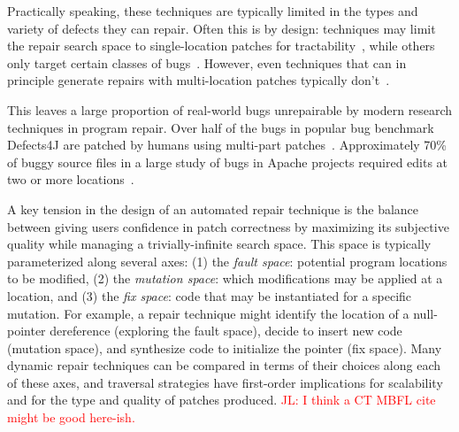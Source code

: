 \documentclass[sigconf, timestamp-false, anonymous=true]{acmart}
\newcommand\todo[1]{\textcolor{red}{#1}}
\begin{document}
Practically speaking, these techniques are typically limited in the types and
variety of defects they can repair. Often this is by design: techniques may
limit the repair search space to single-location patches for
tractability~\cite{rsrepair,ae,hdrepair}, while others only target certain
classes of bugs~\cite{Xuan17,sapfix,DeMarco14,par}. However, even techniques
that can in principle generate repairs with multi-location patches typically
don't~\cite{genprog,others}.

This leaves a large proportion of real-world bugs unrepairable by modern
research techniques in program repair.  Over half of the bugs in popular bug
benchmark Defects4J are patched by humans using multi-part
patches~\cite{d4j-dissection}. Approximately 70\% of buggy source files in a
large study of bugs in Apache projects required edits at two or more
locations~\cite{zhong2015}.

A key tension in the design of an automated repair technique is the balance
between giving users confidence in patch correctness by maximizing its
subjective quality while managing a trivially-infinite search space. This space
is typically parameterized along several axes: (1) the \emph{fault space}:
potential program locations to be modified, (2) the \emph{mutation space}: which
modifications may be applied at a location, and (3) the \emph{fix space}: code
that may be instantiated for a specific mutation. For example, a repair
technique might identify the location of a null-pointer dereference (exploring
the fault space), decide to insert new code (mutation space), and synthesize
code to initialize the pointer (fix space). Many dynamic repair techniques can
be compared in terms of their choices along each of these axes, and traversal
strategies have first-order implications for scalability and for the type and
quality of patches produced. \todo{JL: I think a CT MBFL cite might be good here-ish.}
\end{document}

